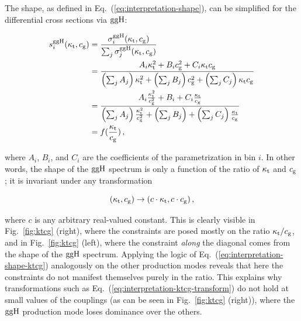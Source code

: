 The shape, as defined in Eq.~(\ref{eq:interpretation-shape}), can be simplified for the differential cross   sections via $\mathrm{g}\mathrm{g}\mathrm{H}$:
% 
\begin{linenomath*}
\begin{equation}
\label{eq:interpretation-shape-ktcg}
\begin{split}
s^{\mathrm{g}\mathrm{g}\mathrm{H}}_i(\kappa_{\mathrm{t}}, c_\mathrm{g})
        &=
        \frac
            {\sigma^{\mathrm{g}\mathrm{g}\mathrm{H}}_i(\kappa_{\mathrm{t}}, c_\mathrm{g})}
            {\sum_j \sigma^{\mathrm{g}\mathrm{g}\mathrm{H}}_j(\kappa_{\mathrm{t}}, c_\mathrm{g})}
            \\
        &=
        \frac
            {A_i \kappa_{\mathrm{t}}^2 + B_i c_\mathrm{g}^2 + C_i \kappa_{\mathrm{t}} c_\mathrm{g}}
            {
                \left(\sum_j A_j\right) \kappa_{\mathrm{t}}^2
                + \left(\sum_j B_j\right) c_\mathrm{g}^2
                + \left(\sum_j C_j\right) \kappa_{\mathrm{t}}c_\mathrm{g}
                }
            \\
        &= 
        \frac
            {A_i \frac{\kappa_{\mathrm{t}}^2}{c_\mathrm{g}^2} + B_i + C_i \frac{\kappa_{\mathrm{t}}}{c_\mathrm{g}}}
            {
                \left(\sum_j A_j\right) \frac{\kappa_{\mathrm{t}}^2}{c_\mathrm{g}^2}
                + \left(\sum_j B_j\right) 
                + \left(\sum_j C_j\right) \frac{\kappa_{\mathrm{t}}}{c_\mathrm{g}}
                }
            \\
        & = f(\frac{\kappa_{\mathrm{t}}}{c_\mathrm{g}})
\,,
\end{split}
\end{equation}
\end{linenomath*}
% 
where $A_i$, $B_i$, and $C_i$ are the coefficients of the parametrization in bin $i$.
% 
In other words, the shape of the $\mathrm{g}\mathrm{g}\mathrm{H}$ spectrum is only a function of the ratio of $\kappa_{\mathrm{t}}$ and $c_\mathrm{g}$; it is invariant under any transformation
% 
\begin{linenomath*}
\begin{equation}
\label{eq:interpretation-ktcg-transform}
(\kappa_{\mathrm{t}}, c_\mathrm{g}) \to (c \cdot \kappa_{\mathrm{t}}, c \cdot c_\mathrm{g})
\,,
\end{equation}
\end{linenomath*}
% 
where $c$ is any arbitrary real-valued constant.
% 
This is clearly visible in Fig.~\ref{fig:ktcg} (right), where the constraints are posed mostly on the ratio $\kappa_{\mathrm{t}} / c_\mathrm{g}$, and in Fig.~\ref{fig:ktcg} (left), where the constraint \emph{along} the diagonal comes from the shape of the $\mathrm{g}\mathrm{g}\mathrm{H}$ spectrum.
% 
Applying the logic of Eq.~(\ref{eq:interpretation-shape-ktcg}) analogously on the other production modes reveals that here the constraints do not manifest themselves purely in the ratio.
% 
This explains why transformations such as Eq.~(\ref{eq:interpretation-ktcg-transform}) do not hold at small values of the couplings (as can be seen in Fig.~\ref{fig:ktcg} (right)), where the $\mathrm{g}\mathrm{g}\mathrm{H}$ production mode loses dominance over the others.
